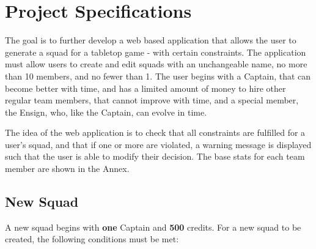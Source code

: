 \documentclass[12pt,a4paper]{article}
\begin{document}
\section{Project Specifications}

The goal is to further develop a web based application that allows the user to generate a squad for a tabletop game - with certain constraints. The application must allow users to create and edit squads with an unchangeable name, no more than 10 members, and no fewer than 1. The user begins with a Captain, that can become better with time, and has a limited amount of money to hire other regular team members, that cannot improve with time, and a special member, the Ensign, who, like the Captain, can evolve in time.

The idea of the web application is to check that all constraints are fulfilled for a user's squad, and that if one or more are violated, a warning message is displayed such that the user is able to modify their decision. The base stats for each team member are shown in the Annex.

\subsection{New Squad}

A new squad begins with \textbf{one} Captain and \textbf{500} credits. For a new squad to be created, the following conditions must be met:
\end{document}
